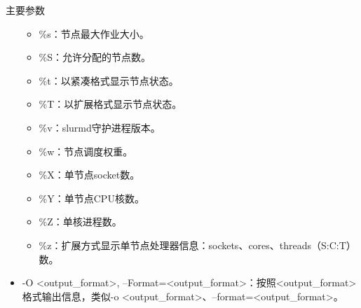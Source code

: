 \begin{frame}{主要参数}
\begin{itemize}
\begin{itemize}
   	\item \%s：节点最大作业大小。
   	\item \%S：允许分配的节点数。
   	\item \%t：以紧凑格式显示节点状态。
   	\item \%T：以扩展格式显示节点状态。
   	\item \%v：slurmd守护进程版本。
   	\item \%w：节点调度权重。
   	\item \%X：单节点socket数。
   	\item \%Y：单节点CPU核数。
   	\item \%Z：单核进程数。
   	\item \%z：扩展方式显示单节点处理器信息：sockets、cores、threads（S:C:T）数。
\end{itemize}
	\item -O <output\_format>, --Format=<output\_format>：按照<output\_format>格式输出信息，类似-o <output\_format>、--format=<output\_format>。


\end{itemize}
\end{frame}
